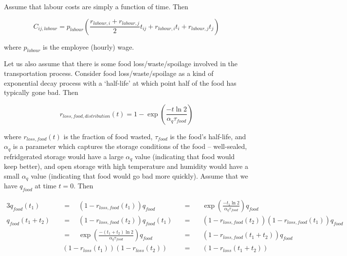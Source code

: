 \documentclass[letter,12pt]{article}
\begin{document}
Assume that labour costs are simply a function of time.  Then

\begin{equation}
C_{ij,labour} = p_{labour} \left( \frac{r_{labour,i} + r_{labour,j}}{2}t_{ij} + r_{labour,i}t_i + r_{labour,j}t_j \right)
\end{equation}

\noindent where $p_{labour}$ is the employee (hourly) wage.

Let us also assume that there is some food loss/waste/spoilage involved in the transportation process.  Consider food loss/waste/spoilage as a kind of exponential decay process with a `half-life' at which point half of the food has typically gone bad.  Then

\begin{equation}
r_{loss,food,distribution}\left(t\right) = 1 - \exp \left( \frac{- t \ln 2}{\alpha_q \tau_{food}}\right)
\end{equation}

\noindent where $r_{loss,food}\left(t\right)$ is the fraction of food wasted, $\tau_{food}$ is the food's half-life, and $\alpha_q$ is a parameter which captures the storage conditions of the food -- well-sealed, refridgerated storage would have a large $\alpha_q$ value (indicating that food would keep better), and open storage with high temperature and humidity would have a small $\alpha_q$ value (indicating that food would go bad more quickly).  Assume that we have $q_{food}$ at time $t=0$.  Then

\begin{alignat}{3}
q_{food} \left(t_1\right) \quad &= \quad  \left(1 - r_{loss,food}\left(t_1\right)\right) q_{food} \quad &=& \quad  \exp \left( \frac{- t_1 \ln 2}{\alpha_q \tau_{food}}\right) q_{food} \\
q_{food} \left(t_1 + t_2\right) \quad &= \quad  \left(1 - r_{loss,food}\left(t_2\right)\right) q_{food} \left(t_1 \right) \quad &=& \quad  \left(1 - r_{loss,food}\left(t_2\right)\right)\left(1 - r_{loss,food}\left(t_1\right)\right) q_{food} \nonumber \\
\quad &= \quad  \exp \left( \frac{- \left(t_1 + t_2\right) \ln 2}{\alpha_q \tau_{food}}\right) q_{food} \quad &=& \quad  \left(1 - r_{loss,food}\left(t_1 + t_2 \right)\right) q_{food}  \label{food loss similarity eqn} \\
&\left(1-r_{loss}\left(t_1\right)\right)\left(1-r_{loss}\left(t_2\right)\right) \quad &=& \quad  \left(1-r_{loss}\left(t_1+t_2\right)\right)
\end{alignat}
\end{document}
